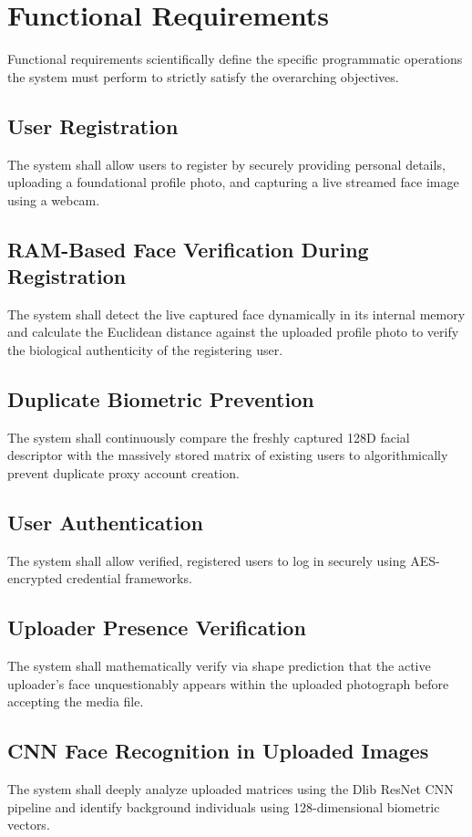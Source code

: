 \section{Functional Requirements}

Functional requirements scientifically define the specific programmatic operations the system must perform to strictly satisfy the overarching objectives.

\subsection{User Registration}
The system shall allow users to register by securely providing personal details, uploading a foundational profile photo, and capturing a live streamed face image using a webcam.

\subsection{RAM-Based Face Verification During Registration}
The system shall detect the live captured face dynamically in its internal memory and calculate the Euclidean distance against the uploaded profile photo to verify the biological authenticity of the registering user.

\subsection{Duplicate Biometric Prevention}
The system shall continuously compare the freshly captured 128D facial descriptor with the massively stored matrix of existing users to algorithmically prevent duplicate proxy account creation.

\subsection{User Authentication}
The system shall allow verified, registered users to log in securely using AES-encrypted credential frameworks.

\subsection{Uploader Presence Verification}
The system shall mathematically verify via shape prediction that the active uploader's face unquestionably appears within the uploaded photograph before accepting the media file.

\subsection{CNN Face Recognition in Uploaded Images}
The system shall deeply analyze uploaded matrices using the Dlib ResNet CNN pipeline and identify background individuals using 128-dimensional biometric vectors.

